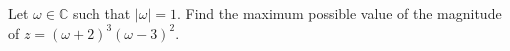 Let $\omega\in\mathbb{C}$ such that $\left|\omega\right|=1$. Find the maximum possible value of the magnitude of $z=\left(\omega+2\right)^3\left(\omega-3\right)^2$.